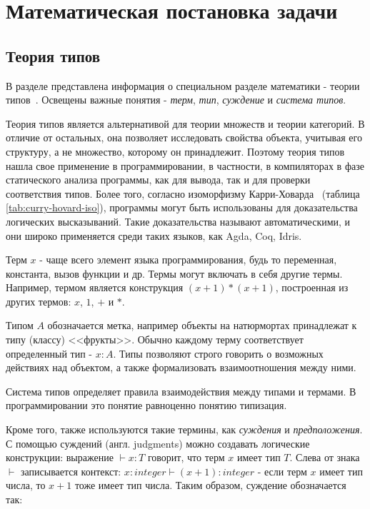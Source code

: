 \chapter{Математическая постановка задачи}
\label{ch:math}


\section{Теория типов}
\label{sec:type_theory}

В разделе представлена информация о специальном разделе математики - теории типов~\cite{TypeTheoryBook}.
Освещены важные понятия - \textit{терм}, \textit{тип}, \textit{суждение} и \textit{система типов}.

Теория типов является альтернативой для теории множеств и теории категорий.
В отличие от остальных, она позволяет исследовать свойства объекта, учитывая его структуру, а не множество, которому он принадлежит.
Поэтому теория типов нашла свое применение в программировании, в частности, в компиляторах в фазе статического анализа программы, как для вывода, так и для проверки соответствия типов.
Более того, согласно изоморфизму Карри-Ховарда~\cite{TypeTheoryArticle} (таблица \ref{tab:curry-hovard-iso}), программы могут быть использованы для доказательства логических высказываний.
Такие доказательства называют автоматическими, и они широко применяется среди таких языков, как Agda, Coq, Idris.

Терм $x$ - чаще всего элемент языка программирования, будь то переменная, константа, вызов функции и др.
Термы могут включать в себя другие термы.
Например, термом является конструкция $(x + 1) * (x + 1)$, построенная из других термов: $x$, $1$, $+$ и $*$.

Типом $A$ обозначается метка, например объекты на натюрмортах принадлежат к типу (классу) <<фрукты>>.
Обычно каждому терму соответствует определенный тип - $x: A$.
Типы позволяют строго говорить о возможных действиях над объектом, а также формализовать взаимоотношения между ними.

Система типов определяет правила взаимодействия между типами и термами.
В программировании это понятие равноценно понятию типизация.

Кроме того, также используются такие термины, как \textit{суждения} и \textit{предположения}.
С помощью суждений (англ. judgments) можно создавать логические конструкции: выражение $\vdash x: T$ говорит, что терм $x$ имеет тип $T$.
Слева от знака $\vdash$ записывается контекст: $x: integer \vdash (x + 1): integer$ - если терм $x$ имеет тип числа, то $x + 1$ тоже имеет тип числа.
Таким образом, суждение обозначается так:

